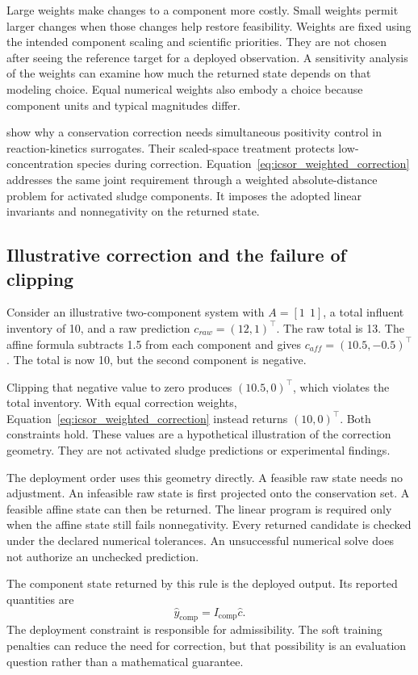 Large weights make changes to a component more costly. Small weights permit larger changes when those changes help restore feasibility. Weights are fixed using the intended component scaling and scientific priorities. They are not chosen after seeing the reference target for a deployed observation. A sensitivity analysis of the weights can examine how much the returned state depends on that modeling choice. Equal numerical weights also embody a choice because component units and typical magnitudes differ.

\citet{KircherVotsmeier2025} show why a conservation correction needs simultaneous positivity control in reaction-kinetics surrogates. Their scaled-space treatment protects low-concentration species during correction. Equation~\eqref{eq:icsor_weighted_correction} addresses the same joint requirement through a weighted absolute-distance problem for activated sludge components. It imposes the adopted linear invariants and nonnegativity on the returned state.

\subsection{Illustrative correction and the failure of clipping}

Consider an illustrative two-component system with \(A=[1\ \ 1]\), a total influent inventory of 10, and a raw prediction \(c_{raw}=(12,1)^\top\). The raw total is 13. The affine formula subtracts 1.5 from each component and gives \(c_{aff}=(10.5,-0.5)^\top\). The total is now 10, but the second component is negative.

Clipping that negative value to zero produces \((10.5,0)^\top\), which violates the total inventory. With equal correction weights, Equation~\eqref{eq:icsor_weighted_correction} instead returns \((10,0)^\top\). Both constraints hold. These values are a hypothetical illustration of the correction geometry. They are not activated sludge predictions or experimental findings.

The deployment order uses this geometry directly. A feasible raw state needs no adjustment. An infeasible raw state is first projected onto the conservation set. A feasible affine state can then be returned. The linear program is required only when the affine state still fails nonnegativity. Every returned candidate is checked under the declared numerical tolerances. An unsuccessful numerical solve does not authorize an unchecked prediction.

The component state returned by this rule is the deployed output. Its reported quantities are
\begin{equation}
\label{eq:icsor_deployed_composites}
\widehat y_{\mathrm{comp}}=I_{\mathrm{comp}}\widehat c.
\end{equation}
The deployment constraint is responsible for admissibility. The soft training penalties can reduce the need for correction, but that possibility is an evaluation question rather than a mathematical guarantee.

